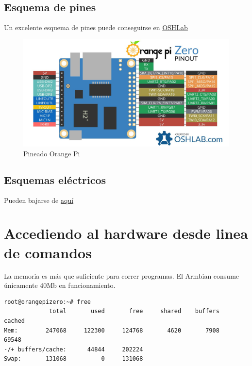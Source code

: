 \documentclass[12pt,spanish,]{scrartcl}
\begin{document}
\subsection{Esquema de pines}\label{esquema-de-pines}

Un excelente esquema de pines puede conseguirse en
\href{https://oshlab.com/orange-pi-zero-pinout/}{OSHLab}

\begin{figure}[htbp]
\centering
\includegraphics{src/img/Orange-Pi-Zero-Pinout.jpg}
\caption{Pineado Orange Pi}
\end{figure}

\subsection{Esquemas eléctricos}\label{esquemas-eluxe9ctricos}

Pueden bajarse de
\href{http://harald.studiokubota.com/wordpress/wp-content/uploads/2016/11/Orange-Pi-Zero-Schanetics-v1_11.pdf}{aquí}

\section{Accediendo al hardware desde linea de
comandos}\label{accediendo-al-hardware-desde-linea-de-comandos}

La memoria es más que suficiente para correr programas. El Armbian
consume únicamente 40Mb en funcionamiento.

\begin{verbatim}
root@orangepizero:~# free
             total       used       free     shared    buffers     cached
Mem:        247068     122300     124768       4620       7908      69548
-/+ buffers/cache:      44844     202224
Swap:       131068          0     131068
\end{verbatim}
\end{document}
